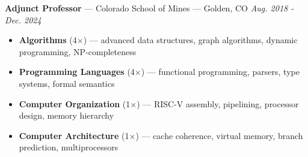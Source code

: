 \documentclass[10pt,letterpaper]{article}
\begin{document}
{\fontsize{11}{0}
\textbf{Adjunct Professor} --- Colorado School of Mines --- Golden, CO}
\hfill \textit{Aug. 2018 - Dec. 2024}
\begin{itemize}
    \item \textbf{Algorithms} (4$\times$) ---
        advanced data structures, graph algorithms, dynamic programming,
        NP-completeness
    \item \textbf{Programming Languages} (4$\times$) ---
        functional programming, parsers, type systems, formal semantics
    \item \textbf{Computer Organization} (1$\times$) ---
        RISC-V assembly, pipelining, processor design, memory hierarchy
    \item \textbf{Computer Architecture} (1$\times$) ---
        cache coherence, virtual memory, branch prediction, multiprocessors
\end{itemize}

\end{document}

